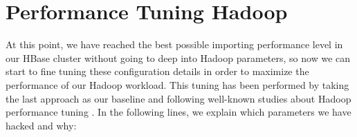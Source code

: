 

\section{Performance Tuning Hadoop}

At this point, we have reached the best possible importing performance level in our HBase cluster without going to deep into Hadoop parameters, so now we can start to fine tuning these configuration details in order to maximize the performance of our Hadoop workload. This tuning has been performed by taking the last approach as our baseline and following well-known studies about Hadoop performance tuning \cite{babu2010towards} \cite{heger2013hadoop}. In the following lines, we explain which parameters we have hacked and why:

